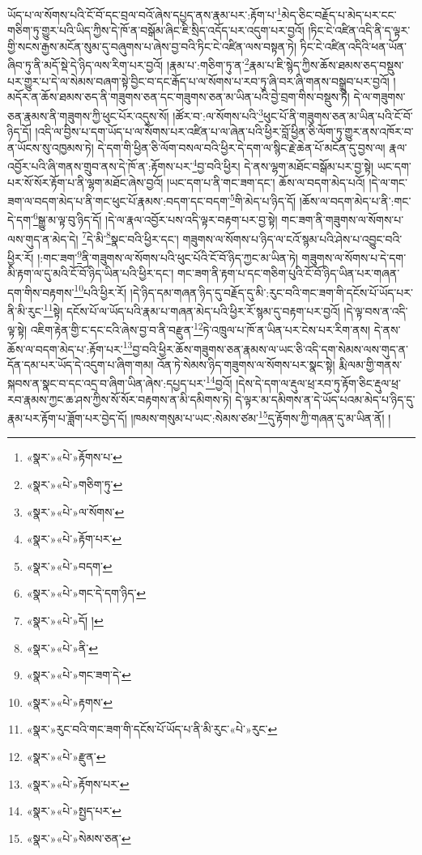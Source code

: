 ཡོད་པ་ལ་སོགས་པའི་ངོ་བོ་དང་བྲལ་བའོ་ཞེས་དཔྱད་ནས་རྣམ་པར་:རྟོག་པ་\footnote{«སྣར་»«པེ་»རྟོགས་པ་}མེད་ཅིང་བརྗོད་པ་མེད་པར་ངང་གཅིག་ཏུ་གྱུར་པའི་ཡིད་ཀྱིས་དེ་ཁོ་ན་བསྒོམ་ཞིང་ཇི་སྲིད་འདོད་པར་འདུག་པར་བྱའོ། །ཏིང་ངེ་འཛིན་འདི་ནི་ད་ལྟར་གྱི་སངས་རྒྱས་མངོན་སུམ་དུ་བཞུགས་པ་ཞེས་བྱ་བའི་ཏིང་ངེ་འཛིན་ལས་བསྟན་ཏེ། ཏིང་ངེ་འཛིན་འདིའི་ཕན་ཡོན་ཞིབ་ཏུ་ནི་མདོ་སྡེ་དེ་ཉིད་ལས་རིག་པར་བྱའོ། །རྣམ་པ་:གཅིག་ཏུ་ན་\footnote{«སྣར་»«པེ་»གཅིག་ཏུ་}རྣམ་པ་ཇི་སྙེད་ཀྱིས་ཆོས་ཐམས་ཅད་བསྡུས་པར་གྱུར་པ་དེ་ལ་སེམས་བཞག་སྟེ་བྱིང་བ་དང་རྒོད་པ་ལ་སོགས་པ་རབ་ཏུ་ཞི་བར་ཞི་གནས་བསྒྲུབ་པར་བྱའོ། །མདོར་ན་ཆོས་ཐམས་ཅད་ནི་གཟུགས་ཅན་དང་གཟུགས་ཅན་མ་ཡིན་པའི་བྱེ་བྲག་གིས་བསྡུས་ཏེ། དེ་ལ་གཟུགས་ཅན་རྣམས་ནི་གཟུགས་ཀྱི་ཕུང་པོར་འདུས་སོ། །ཚོར་བ་:ལ་སོགས་པའི་\footnote{«སྣར་»«པེ་»ལ་སོགས་}ཕུང་པོ་ནི་གཟུགས་ཅན་མ་ཡིན་པའི་ངོ་བོ་ཉིད་དོ། །འདི་ལ་བྱིས་པ་དག་ཡོད་པ་ལ་སོགས་པར་འཛིན་པ་ལ་ཞེན་པའི་ཕྱིར་བློ་ཕྱིན་ཅི་ལོག་ཏུ་གྱུར་ནས་འཁོར་བ་ན་ཡོངས་སུ་འཁྱམས་ཏེ། དེ་དག་གི་ཕྱིན་ཅི་ལོག་བསལ་བའི་ཕྱིར་དེ་དག་ལ་སྙིང་རྗེ་ཆེན་པོ་མངོན་དུ་བྱས་ལ། རྣལ་འབྱོར་པའི་ཞི་གནས་གྲུབ་ནས་དེ་ཁོ་ན་:རྟོགས་པར་\footnote{«སྣར་»«པེ་»རྟོག་པར་}བྱ་བའི་ཕྱིར། དེ་ནས་ལྷག་མཐོང་བསྒོམ་པར་བྱ་སྟེ། ཡང་དག་པར་སོ་སོར་རྟོག་པ་ནི་ལྷག་མཐོང་ཞེས་བྱའོ། །ཡང་དག་པ་ནི་གང་ཟག་དང་། ཆོས་ལ་བདག་མེད་པའོ། །དེ་ལ་གང་ཟག་ལ་བདག་མེད་པ་ནི་གང་ཕུང་པོ་རྣམས་:བདག་དང་བདག་\footnote{«སྣར་»«པེ་»བདག་}གི་མེད་པ་ཉིད་དོ། །ཆོས་ལ་བདག་མེད་པ་ནི་:གང་དེ་དག་\footnote{«སྣར་»«པེ་»གང་དེ་དག་ཉིད་}སྒྱུ་མ་ལྟ་བུ་ཉིད་དོ། །དེ་ལ་རྣལ་འབྱོར་པས་འདི་ལྟར་བརྟག་པར་བྱ་སྟེ། གང་ཟག་ནི་གཟུགས་ལ་སོགས་པ་ལས་གུད་ན་མེད་དེ། \footnote{«སྣར་»«པེ་»དོ། །}དེ་མི་\footnote{«སྣར་»«པེ་»ནི་}སྣང་བའི་ཕྱིར་དང་། གཟུགས་ལ་སོགས་པ་ཉིད་ལ་ངའོ་སྙམ་པའི་ཤེས་པ་འབྱུང་བའི་ཕྱིར་རོ། །:གང་ཟག་\footnote{«སྣར་»«པེ་»གང་ཟག་དེ་}ནི་གཟུགས་ལ་སོགས་པའི་ཕུང་པོའི་ངོ་བོ་ཉིད་ཀྱང་མ་ཡིན་ཏེ། གཟུགས་ལ་སོགས་པ་དེ་དག་མི་རྟག་ལ་དུ་མའི་ངོ་བོ་ཉིད་ཡིན་པའི་ཕྱིར་དང་། གང་ཟག་ནི་རྟག་པ་དང་གཅིག་པུའི་ངོ་བོ་ཉིད་ཡིན་པར་གཞན་དག་གིས་བརྟགས་\footnote{«སྣར་»«པེ་»རྟགས་}པའི་ཕྱིར་རོ། །དེ་ཉིད་དམ་གཞན་ཉིད་དུ་བརྗོད་དུ་མི་:རུང་བའི་གང་ཟག་གི་དངོས་པོ་ཡོད་པར་ནི་མི་རུང་\footnote{«སྣར་»རུང་བའི་གང་ཟག་གི་དངོས་པོ་ཡོད་པ་ནི་མི་རུང་«པེ་»རུང་}སྟེ། དངོས་པོ་ལ་ཡོད་པའི་རྣམ་པ་གཞན་མེད་པའི་ཕྱིར་རོ་སྙམ་དུ་བརྟག་པར་བྱའོ། །དེ་ལྟ་བས་ན་འདི་ལྟ་སྟེ། འཇིག་རྟེན་གྱི་ང་དང་ངའི་ཞེས་བྱ་བ་ནི་བརྫུན་\footnote{«སྣར་»«པེ་»རྫུན་}ཏེ་འཁྲུལ་པ་ཁོ་ན་ཡིན་པར་ངེས་པར་རིག་ནས། དེ་ནས་ཆོས་ལ་བདག་མེད་པ་:རྟོག་པར་\footnote{«སྣར་»«པེ་»རྟོགས་པར་}བྱ་བའི་ཕྱིར་ཆོས་གཟུགས་ཅན་རྣམས་ལ་ཡང་ཅི་འདི་དག་སེམས་ལས་གུད་ན་དོན་དམ་པར་ཡོད་དེ་འདུག་པ་ཞིག་གམ། འོན་ཏེ་སེམས་ཉིད་གཟུགས་ལ་སོགས་པར་སྣང་སྟེ། རྨི་ལམ་གྱི་གནས་སྐབས་ན་སྣང་བ་དང་འདྲ་བ་ཞིག་ཡིན་ཞེས་:དཔྱད་པར་\footnote{«སྣར་»«པེ་»སྤྱད་པར་}བྱའོ། །དེས་དེ་དག་ལ་རྡུལ་ཕྲ་རབ་ཏུ་རྟོག་ཅིང་རྡུལ་ཕྲ་རབ་རྣམས་ཀྱང་ཆ་ཤས་ཀྱིས་སོ་སོར་བརྟགས་ན་མི་དམིགས་ཏེ། དེ་ལྟར་མ་དམིགས་ན་དེ་ཡོད་པའམ་མེད་པ་ཉིད་དུ་རྣམ་པར་རྟོག་པ་ཟློག་པར་བྱེད་དོ། །ཁམས་གསུམ་པ་ཡང་:སེམས་ཙམ་\footnote{«སྣར་»«པེ་»སེམས་ཅན་}དུ་རྟོགས་ཀྱི་གཞན་དུ་མ་ཡིན་ནོ། །
